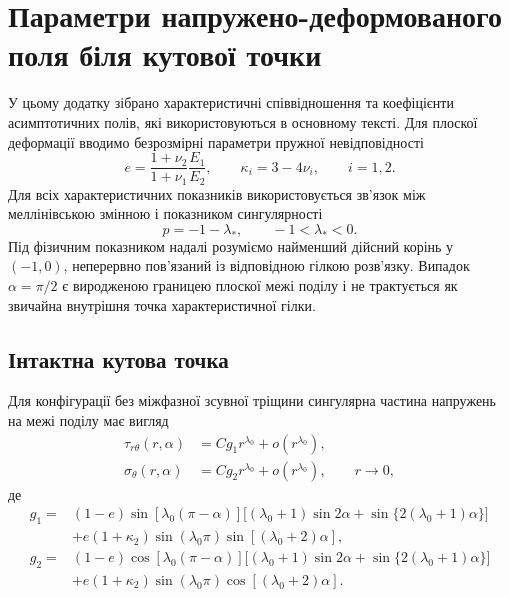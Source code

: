 \section{Параметри напружено-деформованого поля біля кутової точки}
\label{app:asymptotics}

\setcounter{equation}{0}
\renewcommand{\theequation}{A.\arabic{equation}}

У цьому додатку зібрано характеристичні співвідношення та коефіцієнти
асимптотичних полів, які використовуються в основному тексті. Для плоскої
деформації вводимо безрозмірні параметри пружної невідповідності
\begin{equation*}
  e=\frac{1+\nu_2}{1+\nu_1}\frac{E_1}{E_2},
  \qquad
  \kappa_i=3-4\nu_i,\qquad i=1,2.
\end{equation*}
Для всіх характеристичних показників використовується зв'язок між
меллінівською змінною і показником сингулярності
\begin{equation*}
  p=-1-\lambda_*,
  \qquad -1<\lambda_*<0.
\end{equation*}
Під фізичним показником надалі розуміємо найменший дійсний корінь у
$(-1,0)$, неперервно пов'язаний із відповідною гілкою розв'язку. Випадок
$\alpha=\pi/2$ є виродженою границею плоскої межі поділу і не трактується
як звичайна внутрішня точка характеристичної гілки.

\subsection{Інтактна кутова точка}

Для конфігурації без міжфазної зсувної тріщини сингулярна частина
напружень на межі поділу має вигляд~\cite{NazarenkoKipnis2022Stress}
\begin{equation}
\label{eq:app-intact-field}
\begin{aligned}
  \tau_{r\theta}(r,\alpha)
    &=Cg_1r^{\lambda_0}+o\!\left(r^{\lambda_0}\right),\\
  \sigma_\theta(r,\alpha)
    &=Cg_2r^{\lambda_0}+o\!\left(r^{\lambda_0}\right),
    \qquad r\to0,
\end{aligned}
\end{equation}
де
\begin{equation*}
\begin{aligned}
  g_1={}&(1-e)\sin[\lambda_0(\pi-\alpha)]
  \bigl[(\lambda_0+1)\sin2\alpha
       +\sin\{2(\lambda_0+1)\alpha\}\bigr]\\
  &+e(1+\kappa_2)\sin(\lambda_0\pi)
      \sin[(\lambda_0+2)\alpha],\\[2pt]
  g_2={}&(1-e)\cos[\lambda_0(\pi-\alpha)]
  \bigl[(\lambda_0+1)\sin2\alpha
       +\sin\{2(\lambda_0+1)\alpha\}\bigr]\\
  &+e(1+\kappa_2)\sin(\lambda_0\pi)
      \cos[(\lambda_0+2)\alpha].
\end{aligned}
\end{equation*}

